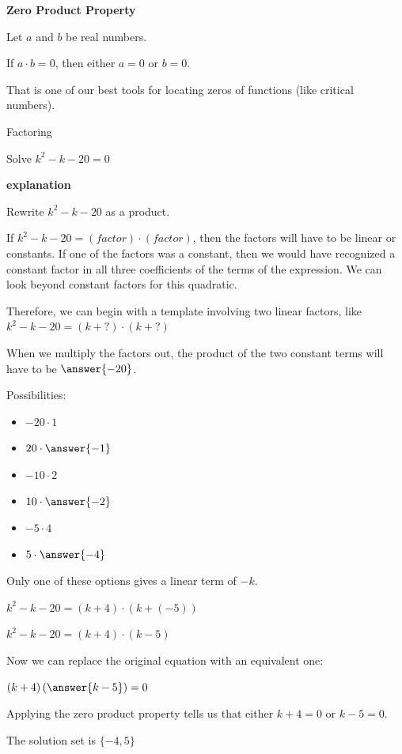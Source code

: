 \documentclass{ximera}
\begin{document}
\begin{definition} \textbf{\textcolor{green!50!black}{Zero Product Property}}  

Let $a$ and $b$ be real numbers. 

If $a \cdot b = 0$, then either $a=0$ or $b=0$.


\end{definition}



That is one of our best tools for locating zeros of functions (like critical numbers). 



\begin{example} Factoring

Solve $k^2 - k - 20 = 0$ 

\textbf{\textcolor{red!75!green}{explanation}} 



Rewrite $k^2 - k - 20$ as a product.

If $k^2 - k - 20 = (factor) \cdot (factor)$, then the factors will have to be linear or constants.  If one of the factors was a constant, then we would have recognized a constant factor in all three coefficients of the terms of the expression.  We can look beyond constant factors for this quadratic. 

Therefore, we can begin with a template involving two linear factors, like $k^2 - k - 20 = (k + ?) \cdot (k + ?)$

When we multiply the factors out, the product of the two constant terms will have to be $\answer{-20}$.

Possibilities:
\begin{itemize}
\item $-20 \cdot 1$
\item $20 \cdot \answer{-1}$
\item $-10 \cdot 2$
\item $10 \cdot \answer{-2}$
\item $-5 \cdot 4$
\item $5 \cdot \answer{-4}$
\end{itemize}



Only one of these options gives a linear term of $-k$.


$k^2 - k - 20 = (k + 4) \cdot (k + (-5))$

$k^2 - k - 20 = (k + 4) \cdot (k - 5)$



Now we can replace the original equation with an equivalent one:


$(k + 4) \left( \answer{k - 5} \right) = 0$



Applying the zero product property tells us that either $k + 4 = 0$ or $k - 5 = 0$.  

The solution set is $\{ -4, 5 \}$





\end{example}
\end{document}
